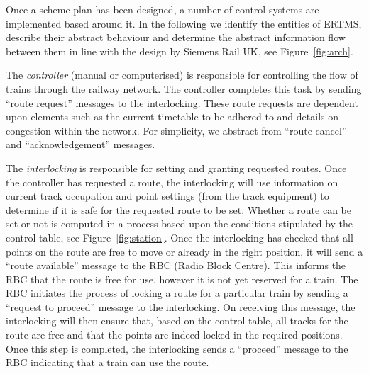 Once a scheme plan has been designed, a number of control systems are
implemented based around it. In the following we %
identify the entities of ERTMS, describe their abstract behaviour and
determine the abstract information flow between them in line with the
design by Siemens Rail UK, see Figure~\ref{fig:arch}.

The \emph{controller} (manual or computerised) is responsible for
controlling the flow of trains through the railway network. The
controller completes this task by sending ``route request'' messages
to the interlocking. These route requests are dependent upon elements
such as the current timetable to be adhered to and details on
congestion within the network. For simplicity, we abstract from
``route cancel'' and ``acknowledgement'' messages.

The \emph{interlocking} is responsible for setting and granting
requested routes. Once the controller has requested a route, the
interlocking will use information on current track occupation and
point settings (from the track equipment) to determine if it is safe
for the requested route to be set. Whether a route can be set or not
is computed in a process based upon the conditions stipulated by the
control table, see Figure~\ref{fig:station}. Once the interlocking has
checked that all points on the route are free to move or already in
the right position, it will send a ``route available'' message to the
RBC (Radio Block Centre). This informs the RBC that the route is free
for use, however it is not yet reserved for a train. The RBC initiates
the process of locking a route for a particular train by sending a
``request to proceed'' message to the interlocking. On receiving this
message, the interlocking will then ensure that, based on the control
table, all tracks for the route are free and that the points are
indeed locked in the required positions. Once this step is completed,
the interlocking sends a ``proceed'' message to the RBC indicating
that a train can use the route.

